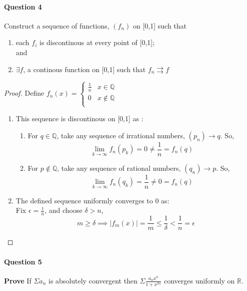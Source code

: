 \documentclass[20pt,a4paper]{extarticle} %
\begin{document}
\paragraph{Question 4}
Construct a sequence of functions, $(f_n)$  on [0,1] such that
	\begin{enumerate}[label=(\alph*)]
		\item each $f_i$ is discontinous at every point of [0,1]; \\
			and
		\item $\exists f$, a continous function on [0,1] such that $f_n \rightrightarrows f$
	\end{enumerate}
	\begin{proof}
		Define $f_n(x)=
		\begin{cases}
			\frac{1}{n} & x \in \mathbb{Q} \\
			0 & x \not \in \mathbb{Q} \\
		\end{cases}$
			\begin{enumerate}[label=(\alph*)]
				\item This sequence is discontinous on [0,1] as :\begin{enumerate}[label=(\roman*)]
					\item For $q\in \mathbb{Q}$, take any sequence of irrational numbers,
						$(p_n)\rightarrow q$. So,
						\[ \lim_{k \to \infty} f_n(p_k)=0\neq \frac{1}{n} = f_n(q) \]
					\item For $p \not \in \mathbb{Q}$, take any sequence of rational numbers,
						$(q_n)\rightarrow p$. So,
						\[ \lim_{k \to \infty} f_n(q_k)=\frac{1}{n}\neq 0= f_n(q) \]
				\end{enumerate}
			\item The defined sequence uniformly converges to 0 as:\\
				Fix $\epsilon = \frac{1}{n}$, and choose  $\delta > n $,
				\[ m \geq \delta \implies |f_m(x)|=\frac{1}{m} \leq \frac{1}{\delta} < \frac{1}{n} = \epsilon \]
			\end{enumerate}

	\end{proof}

\paragraph{Question 5}
\textbf{Prove} If $\Sigma a_n$ is absolutely convergent then $\Sigma \frac{a_n x^n}{1+x^{2n}}$ converges uniformly on $\mathbb{R}.$
\end{document}
